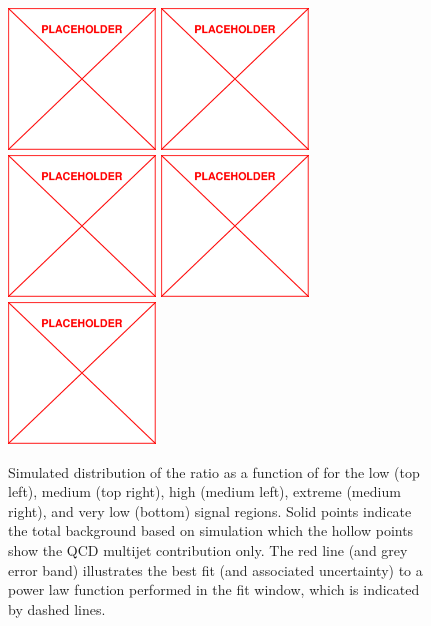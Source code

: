 \begin{figure}
	\centering
	\includegraphics[width=0.35\textwidth]{figs/placeholder}
	\includegraphics[width=0.35\textwidth]{figs/placeholder}
	\includegraphics[width=0.35\textwidth]{figs/placeholder}
	\includegraphics[width=0.35\textwidth]{figs/placeholder}
	\includegraphics[width=0.35\textwidth]{figs/placeholder}
	\caption{Simulated distribution of the \rphi ratio as a function of \mttwo for the low (top left), medium (top right), high (medium left), extreme (medium right), and very low (bottom) \HT signal regions. Solid points indicate the total background based on simulation which the hollow points show the QCD multijet contribution only. The red line (and grey error band) illustrates the best fit (and associated uncertainty) to a power law function performed in the fit window, which is indicated by dashed lines.}
	\label{fig:rphiDependence}
\end{figure}

